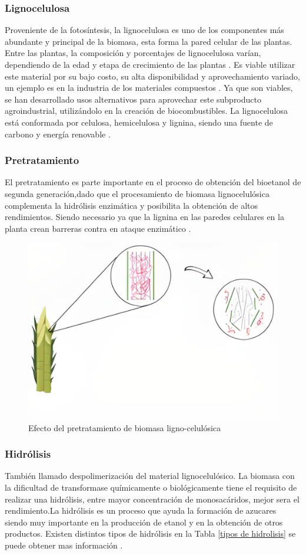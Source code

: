 \documentclass[12pt]{article}
\begin{document}
		\subsubsection{Lignocelulosa}
		
		Proveniente de la fotosíntesis, la lignocelulosa es uno de los componentes más abundante y principal de la biomasa, esta forma la pared celular de las plantas. Entre las plantas, la composición y porcentajes de lignocelulosa varían, dependiendo de la edad y etapa de crecimiento de las plantas \cite{cuervo2009lignocelulosa}.
		Es viable utilizar este material por su bajo costo, su alta disponibilidad y aprovechamiento variado, un ejemplo es en la industria de los materiales compuestos \cite{jara2022principales}.
		Ya que son viables, se han desarrollado usos alternativos para aprovechar este subproducto agroindustrial, utilizándolo en la creación de biocombustibles.
		La lignocelulosa está conformada por celulosa, hemicelulosa y lignina, siendo una fuente de carbono y energía renovable \cite{Portalproduccon}. 
		
		\subsubsection{Pretratamiento}
		
		El pretratamiento es parte importante en el proceso de obtención del bioetanol de segunda generación,dado que el procesamiento de biomasa lignocelulósica complementa la hidrólisis enzimática y posibilita la obtención de altos rendimientos. Siendo necesario ya que la lignina en las paredes celulares en la planta crean barreras contra en ataque enzimático \cite{Riano2010produccion}.
		\newline 
		
		\begin{figure}[H]
			\centering
			\includegraphics[width=0.4\linewidth]{imagenes/pretrata_1}
			\caption{Efecto del pretratamiento de biomasa ligno-celulósica}
			\label{fig:pretrata1}
		\end{figure}
		
		
		\subsubsection{Hidrólisis}
		También llamado despolimerización del material lignocelulósico. La biomasa con la dificultad de transformase químicamente  o biológicamente tiene el requisito de realizar una hidrólisis, entre mayor concentración de monosacáridos, mejor sera el rendimiento.La hidrólisis es un proceso que ayuda la formación de azucares siendo muy importante en la producción de etanol y en la obtención de otros productos. Existen distintos tipos de hidrólisis en la Tabla \ref{tipos de hidrolisis} se puede obtener mas información .
		
\end{document}
